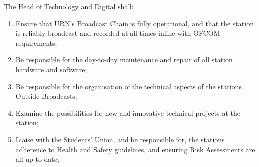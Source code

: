 \item The Head of Technology and Digital shall:
\begin{enumerate}[label*=\arabic*.]
    \item Ensure that URN's Broadcast Chain is fully operational, and that the station is reliably broadcast and recorded at all times inline with OFCOM requirements;
    \item Be responsible for the day-to-day maintenance and repair of all station hardware and software;
    \item Be responsible for the organisation of the technical aspects of the stations Outside Broadcasts;
    \item Examine the possibilities for new and innovative technical projects at the station;
    \item Liaise with the Students' Union, and be responsible for, the stations adherence to Health and Safety guidelines, and ensuring Risk Assessments are all up-to-date;
\end{enumerate}
